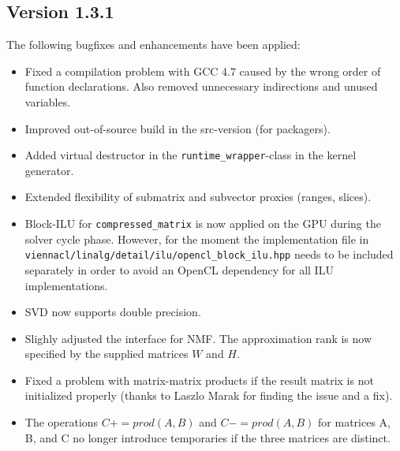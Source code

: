 \subsection*{Version 1.3.1}
The following bugfixes and enhancements have been applied:
\begin{itemize}
 \item Fixed a compilation problem with GCC 4.7 caused by the wrong order of function declarations. Also removed unnecessary indirections and unused variables.
 \item Improved out-of-source build in the src-version (for packagers).
 \item Added virtual destructor in the \lstinline|runtime_wrapper|-class in the kernel generator.
 \item Extended flexibility of submatrix and subvector proxies (ranges, slices).
 \item Block-ILU for \lstinline|compressed_matrix| is now applied on the GPU during the solver cycle phase. However, for the moment the implementation file in \newline \texttt{viennacl/linalg/detail/ilu/opencl\_block\_ilu.hpp} needs to be included separately in order to avoid an OpenCL dependency for all ILU implementations.
 \item SVD now supports double precision.
 \item Slighly adjusted the interface for NMF. The approximation rank is now specified by the supplied matrices $W$ and $H$.
 \item Fixed a problem with matrix-matrix products if the result matrix is not initialized properly (thanks to Laszlo Marak for finding the issue and a fix).
 \item The operations $C += prod(A, B)$ and $C -= prod(A, B)$ for matrices A, B, and C no longer introduce temporaries if the three matrices are distinct.
\end{itemize}



